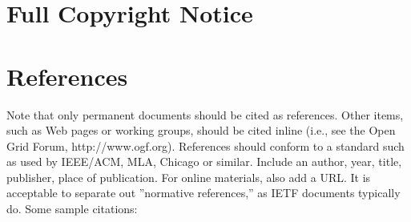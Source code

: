 \documentclass[10pt,a4paper,british]{article}
\begin{document}
\section{Full Copyright Notice}


\section{References}

Note that only permanent documents should be cited as
references. Other items, such as Web pages or working groups, should
be cited inline (i.e., see the Open Grid Forum,
http://www.ogf.org). References should conform to a standard such as
used by IEEE/ACM, MLA, Chicago or similar. Include an author, year,
title, publisher, place of publication. For online materials, also add
a URL. It is acceptable to separate out ''normative references,'' as
IETF documents typically do. Some sample citations:
\end{document}
